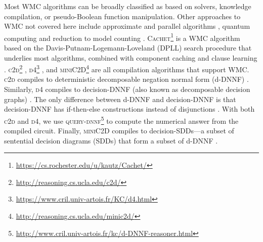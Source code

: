 \documentclass{article}
\theoremstyle{definition}
\theoremstyle{remark}
\begin{document}
Most \textsf{WMC} algorithms can be broadly classified as based on \SAT{}
solvers, knowledge compilation, or pseudo-Boolean function manipulation. Other
approaches to \textsf{WMC} not covered here include approximate
\cite{DBLP:conf/aaai/RenkensKBR14} and parallel algorithms
\cite{DBLP:conf/pgm/DalLL18,DBLP:conf/esa/FichteHWZ18}, quantum computing
\cite{DBLP:conf/ecai/Riguzzi20} and reduction to model counting
\cite{DBLP:conf/ijcai/ChakrabortyFMV15}.
\textsc{Cachet}\footnote{\url{https://cs.rochester.edu/u/kautz/Cachet/}} is a
\textsf{WMC} algorithm based on the Davis-Putnam-Logemann-Loveland (DPLL)
\cite{DBLP:journals/jacm/DavisP60,DBLP:journals/cacm/DavisLL62} search procedure
that underlies most \SAT{} algorithms, combined with component caching and
clause learning \cite{DBLP:conf/sat/SangBBKP04}.
\textsc{c2d}\footnote{\url{http://reasoning.cs.ucla.edu/c2d/}}
\cite{DBLP:conf/ecai/Darwiche04},
\textsc{d4}\footnote{\url{https://www.cril.univ-artois.fr/KC/d4.html}}
\cite{DBLP:conf/ijcai/LagniezM17}, and
\textsc{miniC2D}\footnote{\url{http://reasoning.cs.ucla.edu/minic2d/}}
\cite{DBLP:conf/ijcai/OztokD15} are all compilation algorithms that support
\textsf{WMC}. \textsc{c2d} compiles to deterministic decomposable negation
normal form (d-DNNF) \cite{DBLP:journals/jancl/Darwiche01}. Similarly,
\textsc{d4} compiles to decision-DNNF (also known as decomposable decision
graphs) \cite{DBLP:conf/aaai/FargierM06}. The only difference between d-DNNF and
decision-DNNF is that decision-DNNF has if-then-else constructions instead of
disjunctions \cite{DBLP:conf/ijcai/LagniezM17}. With both \textsc{c2d} and
\textsc{d4}, we use
\textsc{query-dnnf}\footnote{\url{http://www.cril.univ-artois.fr/kc/d-DNNF-reasoner.html}}
to compute the numerical answer from the compiled circuit. Finally,
\textsc{miniC2D} \cite{DBLP:conf/ijcai/OztokD15} compiles to decision-SDDs---a
subset of sentential decision diagrams (SDDs) that form a subset of d-DNNF
\cite{DBLP:conf/ijcai/Darwiche11}.
\end{document}
